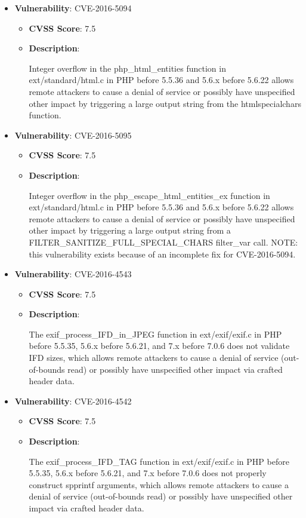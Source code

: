 \documentclass{article}
\begin{document}
\begin{itemize}
        \item \textbf{Vulnerability}: CVE-2016-5094
        \begin{itemize}
            \item \textbf{CVSS Score}:  7.5 
            \item \textbf{Description}:
            \parbox[t]{0.9\linewidth}{
                \ttfamily Integer overflow in the php\_html\_entities function in ext/standard/html.c in PHP before 5.5.36 and 5.6.x before 5.6.22 allows remote attackers to cause a denial of service or possibly have unspecified other impact by triggering a large output string from the htmlspecialchars function.
            }
        \end{itemize}
    
        \item \textbf{Vulnerability}: CVE-2016-5095
        \begin{itemize}
            \item \textbf{CVSS Score}:  7.5 
            \item \textbf{Description}:
            \parbox[t]{0.9\linewidth}{
                \ttfamily Integer overflow in the php\_escape\_html\_entities\_ex function in ext/standard/html.c in PHP before 5.5.36 and 5.6.x before 5.6.22 allows remote attackers to cause a denial of service or possibly have unspecified other impact by triggering a large output string from a FILTER\_SANITIZE\_FULL\_SPECIAL\_CHARS filter\_var call.  NOTE: this vulnerability exists because of an incomplete fix for CVE-2016-5094.
            }
        \end{itemize}
    
        \item \textbf{Vulnerability}: CVE-2016-4543
        \begin{itemize}
            \item \textbf{CVSS Score}:  7.5 
            \item \textbf{Description}:
            \parbox[t]{0.9\linewidth}{
                \ttfamily The exif\_process\_IFD\_in\_JPEG function in ext/exif/exif.c in PHP before 5.5.35, 5.6.x before 5.6.21, and 7.x before 7.0.6 does not validate IFD sizes, which allows remote attackers to cause a denial of service (out-of-bounds read) or possibly have unspecified other impact via crafted header data.
            }
        \end{itemize}
    
        \item \textbf{Vulnerability}: CVE-2016-4542
        \begin{itemize}
            \item \textbf{CVSS Score}:  7.5 
            \item \textbf{Description}:
            \parbox[t]{0.9\linewidth}{
                \ttfamily The exif\_process\_IFD\_TAG function in ext/exif/exif.c in PHP before 5.5.35, 5.6.x before 5.6.21, and 7.x before 7.0.6 does not properly construct spprintf arguments, which allows remote attackers to cause a denial of service (out-of-bounds read) or possibly have unspecified other impact via crafted header data.
            }
        \end{itemize}
    

\end{itemize}
\end{document}
